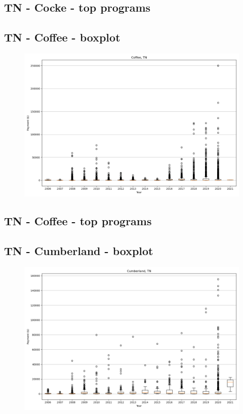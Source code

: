 \subsection*{TN - Cocke - top programs}

\newpage
\subsection*{TN - Coffee - boxplot}
\begin{figure}[h]
\centering
\includegraphics[width=7in]{../output/boxplots/counties/Coffee-TN_boxplot.png}
\end{figure}


\subsection*{TN - Coffee - top programs}

\newpage
\subsection*{TN - Cumberland - boxplot}
\begin{figure}[h]
\centering
\includegraphics[width=7in]{../output/boxplots/counties/Cumberland-TN_boxplot.png}
\end{figure}


